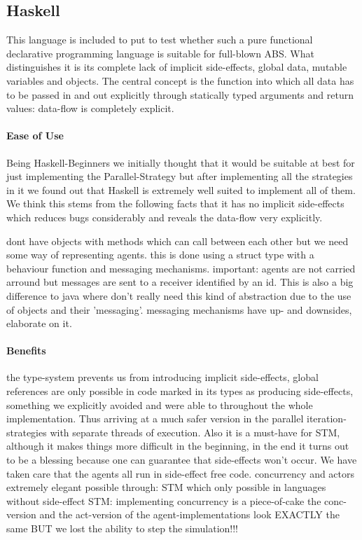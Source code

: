  
\subsection{Haskell}
This language is included to put to test whether such a pure functional declarative programming language is suitable for full-blown ABS. What distinguishes it is its complete lack of implicit side-effects, global data, mutable variables and objects. The central concept is the function into which all data has to be passed in and out explicitly through statically typed arguments and return values: data-flow is completely explicit.

\paragraph{Ease of Use}
Being Haskell-Beginners we initially thought that it would be suitable at best for just implementing the Parallel-Strategy but after implementing all the strategies in it we found out that Haskell is extremely well suited to implement all of them. We think this stems from the following facts that it has no implicit side-effects which reduces bugs considerably and reveals the data-flow very explicitly.

dont have objects with methods which can call between each other but we need some way of representing agents. this is done using a struct type with a behaviour function and messaging mechanisms. important: agents are not carried arround but messages are sent to a receiver identified by an id. This is also a big difference to java where don't really need this kind of abstraction due to the use of objects and their 'messaging'. messaging mechanisms have up- and downsides, elaborate on it.

\paragraph{Benefits}
the type-system prevents us from introducing implicit side-effects, global references are only possible in code marked in its types as producing side-effects, something we explicitly avoided and were able to throughout the whole implementation. Thus arriving at a much safer version in the parallel iteration-strategies with separate threads of execution.
Also it is a must-have for STM, although it makes things more difficult in the beginning, in the end it turns out to be a blessing because one can guarantee that side-effects won't occur. We have taken care that the agents all run in side-effect free code.
concurrency and actors extremely elegant possible through: STM which only possible in languages without side-effect	
STM: implementing concurrency is a piece-of-cake
the conc-version and the act-version of the agent-implementations look EXACTLY the same	 BUT we lost the ability to step the simulation!!!

